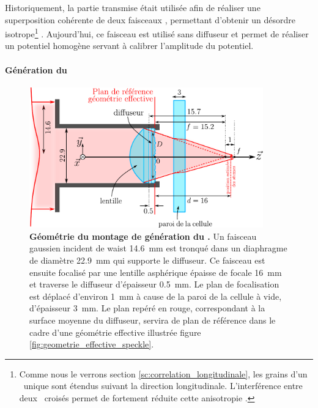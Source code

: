 Historiquement, la partie transmise était utilisée afin de réaliser une superposition cohérente de deux faisceaux \speckle , permettant d'obtenir un désordre isotrope\footnote{Comme nous le verrons section \ref{sc:correlation_longitudinale}, les grains d'un \speckle\ unique sont étendus suivant la direction longitudinale. L'interférence entre deux \speckles\ croisés permet de fortement réduite cette anisotropie \citep{piraud2012localisation}.} \citep{jendrzejewski2012quantum}. Aujourd'hui, ce faisceau est utilisé sans diffuseur et permet de réaliser un potentiel homogène servant à calibrer l'amplitude du potentiel.









\paragraph*{Génération du \speckle}

\begin{figure}
\centering
\includegraphics[width=0.9\textwidth]{Fig/Speckle/montage_diffuseur.pdf}
\caption{\textbf{Géométrie du montage de génération du \speckle .} Un faisceau gaussien incident de waist \SI{14.6}{\milli\metre} est tronqué dans un diaphragme de diamètre \SI{22.9}{\milli\metre} qui supporte le diffuseur. Ce faisceau est ensuite focalisé par une lentille asphérique épaisse de focale \SI{16}{\milli\metre} et traverse le diffuseur d'épaisseur \SI{0.5}{\milli\metre}. Le plan de focalisation est déplacé d'environ \SI{1}{\milli\metre} à cause de la paroi de la cellule à vide, d'épaisseur \SI{3}{\milli\metre}. Le plan repéré en rouge, correspondant à la surface moyenne du diffuseur, servira de plan de référence dans le cadre d'une géométrie effective illustrée figure \ref{fig:geometrie_effective_speckle}.}
\label{fig:montage_diffuseur}
\end{figure}

